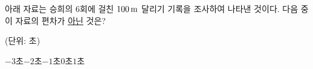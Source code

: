 아래 자료는 승희의 6회에 걸친 $100\mkern3mu \mathrm{m}$ 달리기 기록을 조사하여 나타낸 것이다. 다음 중 이 자료의 편차가 \underline{아닌} 것은?\par\noindent\hfill{\footnotesize (단위: 초)}
\begin{choices32}{$-3$초}{$-2$초}{$-1$초}{$0$초}{$1$초}\end{choices32}
